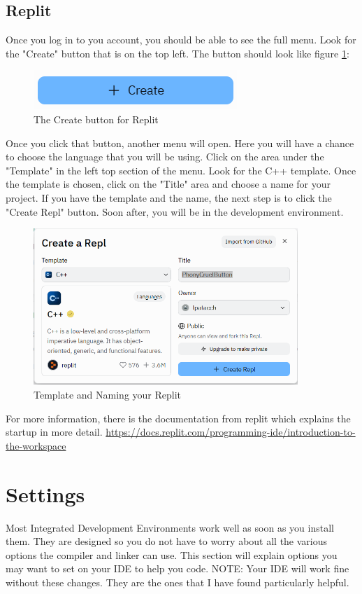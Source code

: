 \subsection{Replit}
Once you log in to you account, you should be able to see the full
menu. Look for the "Create" button that is on the top left. The button
should look like figure \ref{fig:createreplit}:
\begin{figure}[h]
    \centering
    \includegraphics{images/CreateButtonReplit.PNG}
    \caption{The Create button for Replit}
    \label{fig:createreplit}
\end{figure}
Once you click that button, another menu will open. Here you will have a chance to choose the language
that you will be using. Click on the area under the "Template" in the left top section of the menu. Look for the C++ template. Once the template is chosen, click on the "Title" area and choose a name 
for your project. If you have the template and the name, the next step 
is to click the "Create Repl" button. Soon after, you will be in the
development environment.
\begin{figure}[h]
    \centering
    \includegraphics[width = 10cm]{images/createreplitmenu.PNG}
    \caption{Template and Naming your Replit}
    \label{fig:replitmenu}
\end{figure}


For more information, there is the documentation from replit which explains the startup in more detail. 
\url{https://docs.replit.com/programming-ide/introduction-to-the-workspace}
\section{Settings}
Most Integrated Development Environments work well as soon as you install them. They are designed so you do not have to worry about all the various options the compiler and linker can use. This section will explain options you may want to set on your IDE to help you code. NOTE: Your IDE will work fine without these changes. They are the ones that I have found particularly helpful.
